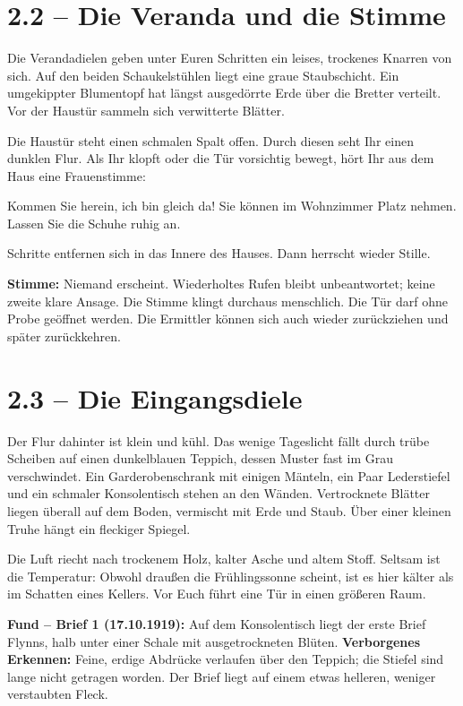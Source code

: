 \section{2.2 -- Die Veranda und die Stimme}
\begin{vorlesetextalle}
Die Verandadielen geben unter Euren Schritten ein leises, trockenes Knarren von sich. Auf den beiden Schaukelstühlen liegt eine graue Staubschicht. Ein umgekippter Blumentopf hat längst ausgedörrte Erde über die Bretter verteilt. Vor der Haustür sammeln sich verwitterte Blätter.

Die Haustür steht einen schmalen Spalt offen. Durch diesen seht Ihr einen dunklen Flur. Als Ihr klopft oder die Tür vorsichtig bewegt, hört Ihr aus dem Haus eine Frauenstimme:

\glqq{}Kommen Sie herein, ich bin gleich da! Sie können im Wohnzimmer Platz nehmen. Lassen Sie die Schuhe ruhig an.\grqq{}

Schritte entfernen sich in das Innere des Hauses. Dann herrscht wieder Stille.
\end{vorlesetextalle}
\begin{meisterinfo}
\textbf{Stimme:} Niemand erscheint. Wiederholtes Rufen bleibt unbeantwortet; keine zweite klare Ansage. Die Stimme klingt durchaus menschlich. Die Tür darf ohne Probe geöffnet werden. Die Ermittler können sich auch wieder zurückziehen und später zurückkehren.
\end{meisterinfo}

\section{2.3 -- Die Eingangsdiele}
\begin{vorlesetextalle}
Der Flur dahinter ist klein und kühl. Das wenige Tageslicht fällt durch trübe Scheiben auf einen dunkelblauen Teppich, dessen Muster fast im Grau verschwindet. Ein Garderobenschrank mit einigen Mänteln, ein Paar Lederstiefel und ein schmaler Konsolentisch stehen an den Wänden. Vertrocknete Blätter liegen überall auf dem Boden, vermischt mit Erde und Staub. Über einer kleinen Truhe hängt ein fleckiger Spiegel.

Die Luft riecht nach trockenem Holz, kalter Asche und altem Stoff. Seltsam ist die Temperatur: Obwohl drau\ss{}en die Frühlingssonne scheint, ist es hier kälter als im Schatten eines Kellers. Vor Euch führt eine Tür in einen grö\ss{}eren Raum.
\end{vorlesetextalle}
\begin{meisterinfo}
\textbf{Fund -- Brief 1 (17.10.1919):} Auf dem Konsolentisch liegt der erste Brief Flynns, halb unter einer Schale mit ausgetrockneten Blüten. \textbf{Verborgenes Erkennen:} Feine, erdige Abdrücke verlaufen über den Teppich; die Stiefel sind lange nicht getragen worden. Der Brief liegt auf einem etwas helleren, weniger verstaubten Fleck.
\end{meisterinfo}

